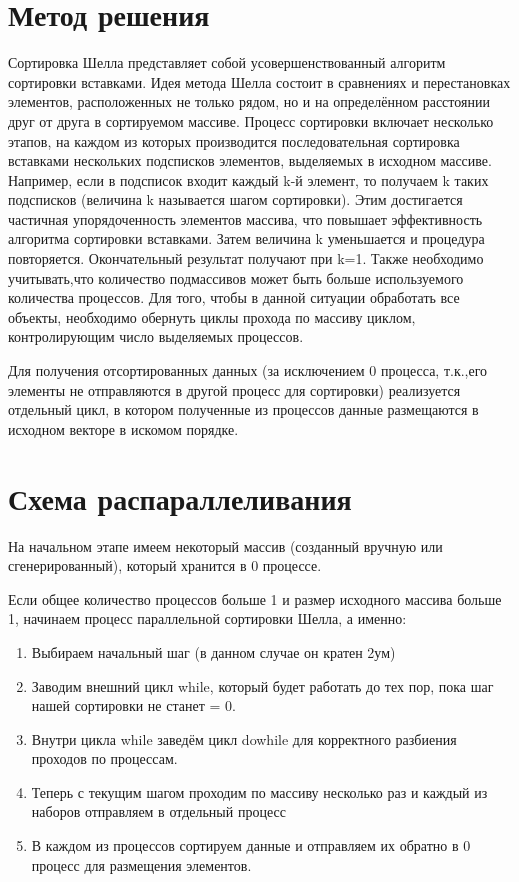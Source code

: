 \documentclass[12pt, letterpaper]{report}
\begin{document}
\section{Метод решения}
Сортировка Шелла представляет собой усовершенствованный алгоритм сортировки
вставками. Идея метода Шелла состоит в сравнениях и перестановках элементов,
расположенных не только рядом, но и на определённом расстоянии друг от друга в
сортируемом массиве. Процесс сортировки включает несколько этапов, на каждом из
которых производится последовательная сортировка вставками нескольких подсписков
элементов, выделяемых в исходном массиве. Например, если в подсписок входит
каждый k-й элемент, то получаем k таких подсписков (величина k называется шагом
сортировки). Этим достигается частичная упорядоченность элементов массива, что
повышает эффективность алгоритма сортировки вставками. Затем величина k
уменьшается и процедура повторяется. Окончательный результат получают при k=1.
Также необходимо учитывать,что количество подмассивов может быть больше
используемого количества процессов. Для того, чтобы в данной ситуации обработать
все объекты, необходимо обернуть циклы прохода по массиву циклом,
контролирующим число выделяемых процессов.

Для получения отсортированных данных (за исключением 0 процесса, т.к.,его
элементы не отправляются в другой процесс для сортировки) реализуется отдельный
цикл, в котором полученные из процессов данные размещаются в исходном векторе в
искомом порядке.
\section{Схема распараллеливания}
На начальном этапе имеем некоторый массив (созданный вручную или
сгенерированный), который хранится в 0 процессе.

Если общее количество процессов больше 1 и размер исходного массива больше 1,
начинаем процесс параллельной сортировки Шелла, а именно:
\begin{enumerate} 
\item Выбираем начальный шаг (в данном случае он кратен 2ум)
\item Заводим внешний цикл while, который будет работать до тех пор, пока шаг
нашей сортировки не станет = 0.
\item Внутри цикла while заведём цикл do{}while для корректного разбиения
проходов по процессам.
\item Теперь с текущим шагом проходим по массиву несколько раз и каждый из
наборов отправляем в отдельный процесс
\item В каждом из процессов сортируем данные и отправляем их обратно в 0 процесс
для размещения элементов.

\end{enumerate}
\end{document}
